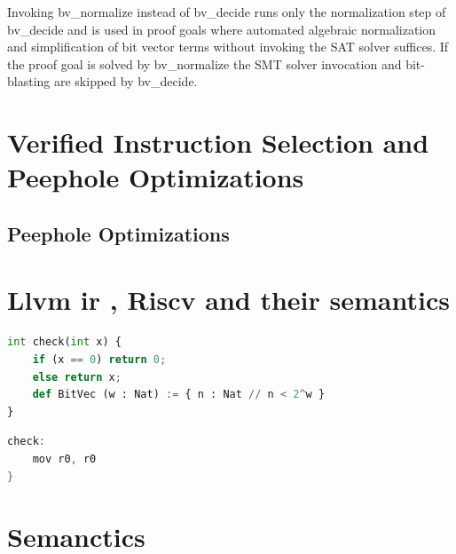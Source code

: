 Invoking bv\_normalize instead of bv\_decide runs only the normalization step of bv\_decide  and is used in proof goals where automated algebraic normalization and simplification of bit vector terms without invoking the SAT solver suffices. If the proof goal is solved by bv\_normalize the SMT solver invocation and bit-blasting are skipped by bv\_decide. 
\section{Verified Instruction Selection and Peephole Optimizations } 
\subsection{Peephole Optimizations} 

\section{Llvm ir , Riscv and their semantics} 


\noindent
\begin{minipage}{0.6\textwidth}
\begin{lstlisting}[language=Python, caption=unoptimized]
int check(int x) {						        
	if (x == 0) return 0; 					
    else return x;
    def BitVec (w : Nat) := { n : Nat // n < 2^w }
}
\end{lstlisting}
\end{minipage}
\hfill
\begin{minipage}{0.45\textwidth}
\begin{lstlisting}[language=C, caption= optimzed assembly]
check: 
    mov r0, r0
}
\end{lstlisting}
\end{minipage}


\section {Semanctics}

